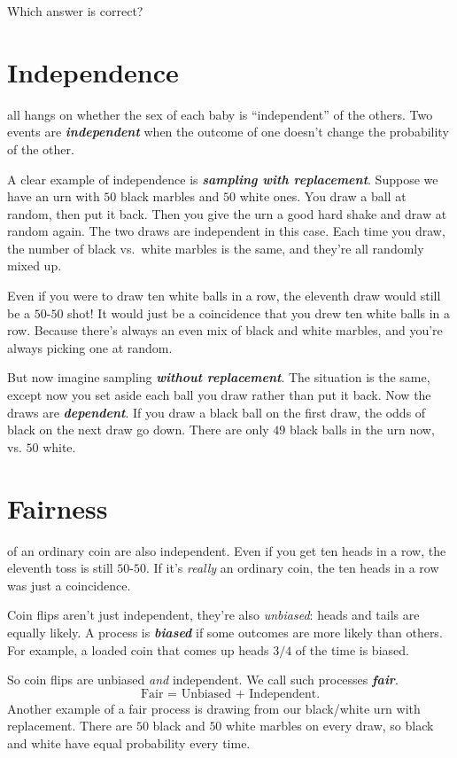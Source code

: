 \documentclass[justified]{tufte-book}
\theoremstyle{definition}
\theoremstyle{definition}
\theoremstyle{definition}
\theoremstyle{remark}
\begin{document}
Which answer is correct?

\hypertarget{independence}{%
\section{Independence}\label{independence}}

 all hangs on whether the sex of each baby is ``independent'' of the others. Two events are \textbf{\emph{independent}} when the outcome of one doesn't change the probability of the other.

A clear example of independence is \textbf{\emph{sampling with replacement}}. Suppose we have an urn with \(50\) black marbles and \(50\) white ones. You draw a ball at random, then put it back. Then you give the urn a good hard shake and draw at random again. The two draws are independent in this case. Each time you draw, the number of black vs.~white marbles is the same, and they're all randomly mixed up.

Even if you were to draw ten white balls in a row, the eleventh draw would still be a \(50\)-\(50\) shot! It would just be a coincidence that you drew ten white balls in a row. Because there's always an even mix of black and white marbles, and you're always picking one at random.

But now imagine sampling \textbf{\emph{without replacement}}. The situation is the same, except now you set aside each ball you draw rather than put it back. Now the draws are \textbf{\emph{dependent}}. If you draw a black ball on the first draw, the odds of black on the next draw go down. There are only \(49\) black balls in the urn now, vs. \(50\) white.

\hypertarget{fairness}{%
\section{Fairness}\label{fairness}}

 of an ordinary coin are also independent. Even if you get ten heads in a row, the eleventh toss is still \(50\)-\(50\). If it's \emph{really} an ordinary coin, the ten heads in a row was just a coincidence.

Coin flips aren't just independent, they're also \emph{unbiased}: heads and tails are equally likely. A process is \textbf{\emph{biased}} if some outcomes are more likely than others. For example, a loaded coin that comes up heads \(3/4\) of the time is biased.

So coin flips are unbiased \emph{and} independent. We call such processes \textbf{\emph{fair}}.
\[ \mbox{Fair = Unbiased + Independent}.\]
Another example of a fair process is drawing from our black/white urn with replacement. There are \(50\) black and \(50\) white marbles on every draw, so black and white have equal probability every time.
\end{document}
